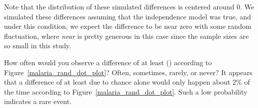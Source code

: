 Note that the distribution of these simulated differences
is centered around 0.
We simulated these differences assuming that the independence
model was true, and under this condition,
we expect the difference to be near zero with some random
fluctuation, where \emph{near} is pretty generous in this
case since the sample sizes are so small in this study.

\begin{examplewrap}
\begin{nexample}{How often would you observe a difference
    of at least \malariaIRDiffPerc{} (\malariaIRDiff{})
    according to Figure~\ref{malaria_rand_dot_plot}?
    Often, sometimes, rarely, or never?}
  It appears that a difference of at least
  \malariaIRDiffPerc{} due to chance alone would only
  happen about 2\% of the time according to
  Figure~\ref{malaria_rand_dot_plot}.
  Such a low probability indicates a rare event.
\end{nexample}
\end{examplewrap}

\D{\newpage}

